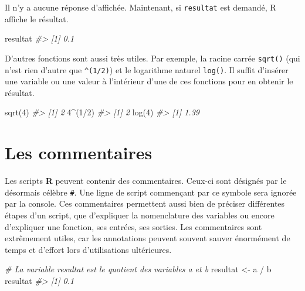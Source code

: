 \documentclass[
]{book}
\newenvironment{Shaded}{}{}
\newcommand{\CommentTok}[1]{\textit{#1}}
\newcommand{\DecValTok}[1]{#1}
\newcommand{\FunctionTok}[1]{#1}
\newcommand{\NormalTok}[1]{#1}
\newcommand{\OtherTok}[1]{#1}
\newcommand{\SpecialCharTok}[1]{#1}
\begin{document}
Il n'y a aucune réponse d'affichée. Maintenant, si \texttt{resultat} est demandé, R affiche le résultat.

\begin{Shaded}
\begin{Highlighting}[]
\NormalTok{resultat}
\CommentTok{\#\textgreater{} [1] 0.1}
\end{Highlighting}
\end{Shaded}

D'autres fonctions sont aussi très utiles. Par exemple, la racine carrée \texttt{sqrt()} (qui n'est rien d'autre que \texttt{\^{}(1/2)}) et le logarithme naturel \texttt{log()}. Il suffit d'insérer une variable ou une valeur à l'intérieur d'une de ces fonctions pour en obtenir le résultat.

\begin{Shaded}
\begin{Highlighting}[]
\FunctionTok{sqrt}\NormalTok{(}\DecValTok{4}\NormalTok{)}
\CommentTok{\#\textgreater{} [1] 2}
\DecValTok{4}\SpecialCharTok{\^{}}\NormalTok{(}\DecValTok{1}\SpecialCharTok{/}\DecValTok{2}\NormalTok{)}
\CommentTok{\#\textgreater{} [1] 2}
\FunctionTok{log}\NormalTok{(}\DecValTok{4}\NormalTok{)}
\CommentTok{\#\textgreater{} [1] 1.39}
\end{Highlighting}
\end{Shaded}

\hypertarget{les-commentaires}{%
\section{Les commentaires}\label{les-commentaires}}

Les scripts \textbf{R} peuvent contenir des commentaires. Ceux-ci sont désignés par le désormais célèbre \texttt{\#}. Une ligne de script commençant par ce symbole sera ignorée par la console. Ces commentaires permettent aussi bien de préciser différentes étapes d'un script, que d'expliquer la nomenclature des variables ou encore d'expliquer une fonction, ses entrées, ses sorties. Les commentaires sont extrêmement utiles, car les annotations peuvent souvent sauver énormément de temps et d'effort lors d'utilisations ultérieures.

\begin{Shaded}
\begin{Highlighting}[]
\CommentTok{\# La variable resultat est le quotient des variables a et b}
\NormalTok{resultat }\OtherTok{\textless{}{-}}\NormalTok{ a }\SpecialCharTok{/}\NormalTok{ b}
\NormalTok{resultat}
\CommentTok{\#\textgreater{} [1] 0.1}
\end{Highlighting}
\end{Shaded}
\end{document}
